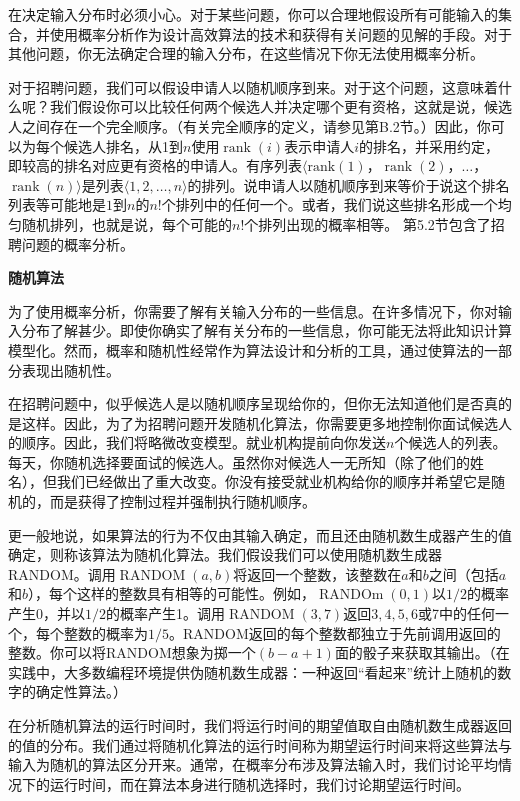 \documentclass[lang=cn,newtx,10pt,scheme=chinese]{elegantbook}
\begin{document}
在决定输入分布时必须小心。对于某些问题，你可以合理地假设所有可能输入的集合，并使用概率分析作为设计高效算法的技术和获得有关问题的见解的手段。对于其他问题，你无法确定合理的输入分布，在这些情况下你无法使用概率分析。

对于招聘问题，我们可以假设申请人以随机顺序到来。对于这个问题，这意味着什么呢？我们假设你可以比较任何两个候选人并决定哪个更有资格，这就是说，候选人之间存在一个完全顺序。（有关完全顺序的定义，请参见第B.2节。）因此，你可以为每个候选人排名，从1到$n$使用$\operatorname{rank}(i)$表示申请人$i$的排名，并采用约定，即较高的排名对应更有资格的申请人。有序列表$\langle\operatorname{rank(1)}$，$\operatorname{rank}(2)$，$\ldots$，$\operatorname{rank}(n)\rangle$是列表$\langle 1,2,\ldots,n\rangle$的排列。说申请人以随机顺序到来等价于说这个排名列表等可能地是$1$到$n$的$n$!个排列中的任何一个。或者，我们说这些排名形成一个均匀随机排列，也就是说，每个可能的$n$!个排列出现的概率相等。
第5.2节包含了招聘问题的概率分析。

\textbf{随机算法}

为了使用概率分析，你需要了解有关输入分布的一些信息。在许多情况下，你对输入分布了解甚少。即使你确实了解有关分布的一些信息，你可能无法将此知识计算模型化。然而，概率和随机性经常作为算法设计和分析的工具，通过使算法的一部分表现出随机性。

在招聘问题中，似乎候选人是以随机顺序呈现给你的，但你无法知道他们是否真的是这样。因此，为了为招聘问题开发随机化算法，你需要更多地控制你面试候选人的顺序。因此，我们将略微改变模型。就业机构提前向你发送$n$个候选人的列表。每天，你随机选择要面试的候选人。虽然你对候选人一无所知（除了他们的姓名），但我们已经做出了重大改变。你没有接受就业机构给你的顺序并希望它是随机的，而是获得了控制过程并强制执行随机顺序。

更一般地说，如果算法的行为不仅由其输入确定，而且还由随机数生成器产生的值确定，则称该算法为随机化算法。我们假设我们可以使用随机数生成器RANDOM。调用$\operatorname{RANDOM}(a,b)$将返回一个整数，该整数在$a$和$b$之间（包括$a$和$b$），每个这样的整数具有相等的可能性。例如，$\operatorname{RANDOm}(0,1)$以$1/2$的概率产生0，并以$1/2$的概率产生1。调用$\operatorname{RANDOM}(3,7)$返回$3,4,5,6$或7中的任何一个，每个整数的概率为$1/5$。RANDOM返回的每个整数都独立于先前调用返回的整数。你可以将RANDOM想象为掷一个$(b-a+1)$面的骰子来获取其输出。（在实践中，大多数编程环境提供伪随机数生成器：一种返回“看起来”统计上随机的数字的确定性算法。）

在分析随机算法的运行时间时，我们将运行时间的期望值取自由随机数生成器返回的值的分布。我们通过将随机化算法的运行时间称为期望运行时间来将这些算法与输入为随机的算法区分开来。通常，在概率分布涉及算法输入时，我们讨论平均情况下的运行时间，而在算法本身进行随机选择时，我们讨论期望运行时间。
\end{document}
